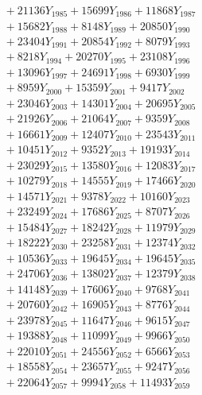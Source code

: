 \documentclass[a4paper,10pt]{article}
\begin{document}
{\begin{align}
&\;  + 21136 Y_{1985} + 15699 Y_{1986} + 11868 Y_{1987} \\[0.3ex]
&\;  + 15682 Y_{1988} + 8148 Y_{1989} + 20850 Y_{1990} \\[0.3ex]
&\;  + 23404 Y_{1991} + 20854 Y_{1992} + 8079 Y_{1993} \\[0.3ex]
&\;  + 8218 Y_{1994} + 20270 Y_{1995} + 23108 Y_{1996} \\[0.3ex]
&\;  + 13096 Y_{1997} + 24691 Y_{1998} + 6930 Y_{1999} \\[0.3ex]
&\;  + 8959 Y_{2000} + 15359 Y_{2001} + 9417 Y_{2002} \\[0.3ex]
&\;  + 23046 Y_{2003} + 14301 Y_{2004} + 20695 Y_{2005} \\[0.3ex]
&\;  + 21926 Y_{2006} + 21064 Y_{2007} + 9359 Y_{2008} \\[0.5ex]\allowbreak
&\;  + 16661 Y_{2009} + 12407 Y_{2010} + 23543 Y_{2011} \\[0.3ex]
&\;  + 10451 Y_{2012} + 9352 Y_{2013} + 19193 Y_{2014} \\[0.3ex]
&\;  + 23029 Y_{2015} + 13580 Y_{2016} + 12083 Y_{2017} \\[0.3ex]
&\;  + 10279 Y_{2018} + 14555 Y_{2019} + 17466 Y_{2020} \\[0.3ex]
&\;  + 14571 Y_{2021} + 9378 Y_{2022} + 10160 Y_{2023} \\[0.3ex]
&\;  + 23249 Y_{2024} + 17686 Y_{2025} + 8707 Y_{2026} \\[0.3ex]
&\;  + 15484 Y_{2027} + 18242 Y_{2028} + 11979 Y_{2029} \\[0.3ex]
&\;  + 18222 Y_{2030} + 23258 Y_{2031} + 12374 Y_{2032} \\[0.3ex]
&\;  + 10536 Y_{2033} + 19645 Y_{2034} + 19645 Y_{2035} \\[0.3ex]
&\;  + 24706 Y_{2036} + 13802 Y_{2037} + 12379 Y_{2038} \\[0.5ex]\allowbreak
&\;  + 14148 Y_{2039} + 17606 Y_{2040} + 9768 Y_{2041} \\[0.3ex]
&\;  + 20760 Y_{2042} + 16905 Y_{2043} + 8776 Y_{2044} \\[0.3ex]
&\;  + 23978 Y_{2045} + 11647 Y_{2046} + 9615 Y_{2047} \\[0.3ex]
&\;  + 19388 Y_{2048} + 11099 Y_{2049} + 9966 Y_{2050} \\[0.3ex]
&\;  + 22010 Y_{2051} + 24556 Y_{2052} + 6566 Y_{2053} \\[0.3ex]
&\;  + 18558 Y_{2054} + 23657 Y_{2055} + 9247 Y_{2056} \\[0.3ex]
&\;  + 22064 Y_{2057} + 9994 Y_{2058} + 11493 Y_{2059} \\[0.3ex]

\end{align}}
\end{document}
